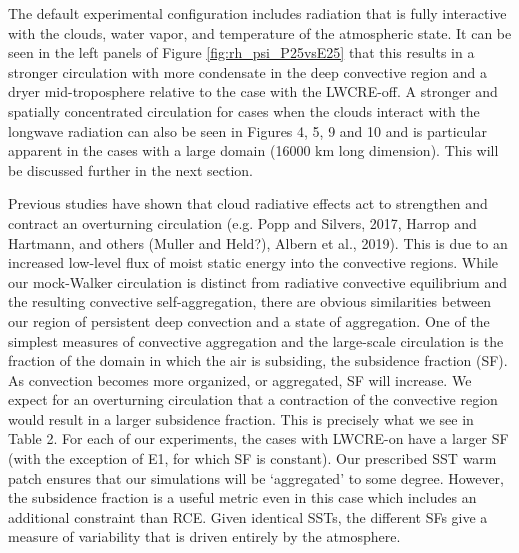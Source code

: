\documentclass[draft]{agujournal2019}
\begin{document}

The default experimental configuration includes radiation that is fully interactive with the clouds, water vapor, and 
temperature of the atmospheric state.  It can be seen in the left panels of Figure \ref{fig:rh_psi_P25vsE25} that this 
results in a stronger circulation with more condensate in the deep convective region and a dryer mid-troposphere
relative to the case with the LWCRE-off.   A stronger and spatially concentrated circulation for cases when the 
clouds interact with the longwave radiation can also be seen in Figures 4, 5, 9 and 10 and is particular apparent in 
the cases with a large domain (16000 km long dimension).  This will be discussed further in the next section.  

Previous studies have shown that cloud radiative effects act to strengthen and contract an overturning circulation 
(e.g. Popp and Silvers, 2017, Harrop and Hartmann, and others (Muller and Held?), Albern et al., 2019).  This is 
due to an increased low-level flux
of moist static energy into the convective regions.  While our mock-Walker circulation is distinct from radiative
convective equilibrium and the resulting convective self-aggregation, there are obvious similarities between our 
region of persistent deep convection and a state of aggregation.   One of the simplest measures of convective 
aggregation and the large-scale circulation is the fraction of the domain in which the air is subsiding, the 
subsidence fraction (SF).  As convection becomes more organized, or aggregated, SF will increase.  We expect 
for an overturning circulation that a contraction of the convective region would result in a larger subsidence 
fraction.  This is precisely what we see in Table 2.  For each of our experiments, the cases with LWCRE-on
have a larger SF (with the exception of E1, for which SF is constant).  Our prescribed SST warm patch ensures that our simulations will 
be `aggregated' to some degree.  However, the subsidence fraction is a useful metric even in this case which 
includes an additional constraint than RCE.  Given identical SSTs, the different SFs give a measure of variability
that is driven entirely by the atmosphere.  
\end{document}
